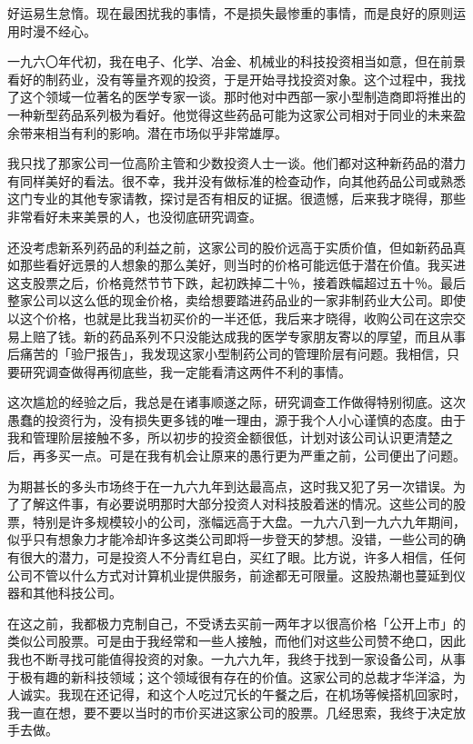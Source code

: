 \documentclass[UTF8,a4paper,zihao=-4,fontset = windows]{ctexart} %
\begin{document}
好运易生怠惰。现在最困扰我的事情，不是损失最惨重的事情，而是良好的原则运用时漫不经心。

一九六〇年代初，我在电子、化学、冶金、机械业的科技投资相当如意，但在前景看好的制药业，没有等量齐观的投资，于是开始寻找投资对象。这个过程中，我找了这个领域一位著名的医学专家一谈。那时他对中西部一家小型制造商即将推出的一种新型药品系列极为看好。他觉得这些药品可能为这家公司相对于同业的未来盈余带来相当有利的影响。潜在市场似乎非常雄厚。

我只找了那家公司一位高阶主管和少数投资人士一谈。他们都对这种新药品的潜力有同样美好的看法。很不幸，我并没有做标准的检查动作，向其他药品公司或熟悉这门专业的其他专家请教，探讨是否有相反的证据。很遗憾，后来我才晓得，那些非常看好未来美景的人，也没彻底研究调查。

还没考虑新系列药品的利益之前，这家公司的股价远高于实质价值，但如新药品真如那些看好远景的人想象的那么美好，则当时的价格可能远低于潜在价值。我买进这支股票之后，价格竟然节节下跌，起初跌掉二十％，接着跌幅超过五十％。最后整家公司以这么低的现金价格，卖给想要踏进药品业的一家非制药业大公司。即使以这个价格，也就是比我当初买价的一半还低，我后来才晓得，收购公司在这宗交易上赔了钱。新的药品系列不只没能达成我的医学专家朋友寄以的厚望，而且从事后痛苦的「验尸报告」，我发现这家小型制药公司的管理阶层有问题。我相信，只要研究调查做得再彻底些，我一定能看清这两件不利的事情。

这次尴尬的经验之后，我总是在诸事顺遂之际，研究调查工作做得特别彻底。这次愚蠢的投资行为，没有损失更多钱的唯一理由，源于我个人小心谨慎的态度。由于我和管理阶层接触不多，所以初步的投资金额很低，计划对该公司认识更清楚之后，再多买一点。可是在我有机会让原来的愚行更为严重之前，公司便出了问题。

为期甚长的多头市场终于在一九六九年到达最高点，这时我又犯了另一次错误。为了了解这件事，有必要说明那时大部分投资人对科技股着迷的情况。这些公司的股票，特别是许多规模较小的公司，涨幅远高于大盘。一九六八到一九六九年期间，似乎只有想象力才能冷却许多这类公司即将一步登天的梦想。没错，一些公司的确有很大的潜力，可是投资人不分青红皂白，买红了眼。比方说，许多人相信，任何公司不管以什么方式对计算机业提供服务，前途都无可限量。这股热潮也蔓延到仪器和其他科技公司。

在这之前，我都极力克制自己，不受诱去买前一两年才以很高价格「公开上市」的类似公司股票。可是由于我经常和一些人接触，而他们对这些公司赞不绝口，因此我也不断寻找可能值得投资的对象。一九六九年，我终于找到一家设备公司，从事于极有趣的新科技领域；这个领域很有存在的价值。这家公司的总裁才华洋溢，为人诚实。我现在还记得，和这个人吃过冗长的午餐之后，在机场等候搭机回家时，我一直在想，要不要以当时的市价买进这家公司的股票。几经思索，我终于决定放手去做。
\end{document}

